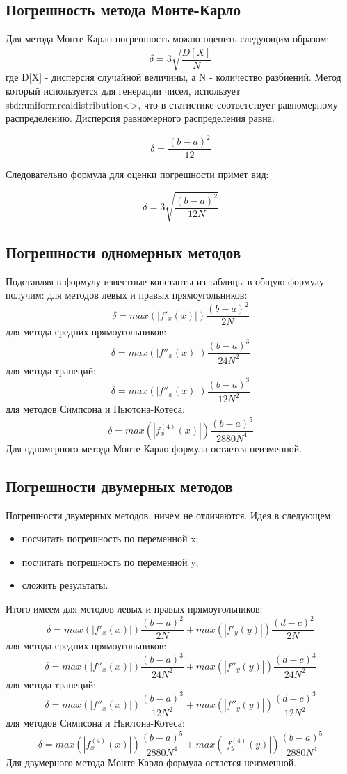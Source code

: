 \documentclass{article}
\begin{document}
\subsection{Погрешность метода Монте-Карло}
Для метода Монте-Карло погрешность можно оценить следующим образом:
$$\delta = 3\sqrt{\frac{D[X]}{N}} $$
где D[X] - дисперсия случайной величины, а N - количество разбиений.
Метод который используется для генерации чисел, использует
std::uniform\text{_}real\text{_}distribution<>, что в статистике
соответствует равномерному распределению. Дисперсия равномерного распределения
равна:

$$ \delta = \frac{(b-a)^2}{12} $$

Следовательно формула для оценки погрешности примет вид:

$$\delta = 3\sqrt{\frac{(b-a)^2}{12N}} $$

\subsection{Погрешности одномерных методов}
Подставляя в формулу известные константы из таблицы в общую формулу получим:
для методов левых и правых прямоугольников:
$$\delta = max(|f'_{x}(x)|)\frac{(b-a)^2}{2N} $$
для метода средних прямоугольников:
$$\delta = max(|f''_{x}(x)|)\frac{(b-a)^3}{24N^2} $$
для метода трапеций:
$$\delta = max(|f''_{x}(x)|)\frac{(b-a)^3}{12N^2} $$
для методов Симпсона и Ньютона-Котеса:
$$\delta = max(|f^{(4)}_{x}(x)|)\frac{(b-a)^5}{2880N^4} $$
Для одномерного метода Монте-Карло формула остается неизменной.
\subsection{Погрешности двумерных методов}
Погрешности двумерных методов, ничем не отличаются. Идея в следующем:
\begin{itemize}
  \item посчитать погрешность по переменной x;
  \item посчитать погрешность по переменной y;
  \item сложить результаты.
\end{itemize}
Итого имеем для методов левых и правых прямоугольников:
$$\delta = max(|f'_{x}(x)|)\frac{(b-a)^2}{2N}+max(|f'_{y}(y)|)\frac{(d-c)^2}{2N}  $$
для метода средних прямоугольников:
$$\delta = max(|f''_{x}(x)|)\frac{(b-a)^3}{24N^2}+max(|f''_{y}(y)|)\frac{(d-c)^3}{24N^2} $$
для метода трапеций:
$$\delta = max(|f''_{x}(x)|)\frac{(b-a)^3}{12N^2}+max(|f''_{y}(y)|)\frac{(d-c)^3}{12N^2} $$
для методов Симпсона и Ньютона-Котеса:
$$\delta = max(|f^{(4)}_{x}(x)|)\frac{(b-a)^5}{2880N^4}+max(|f^{(4)}_{y}(y)|)\frac{(b-a)^5}{2880N^4} $$
Для двумерного метода Монте-Карло формула остается неизменной.
\end{document}

